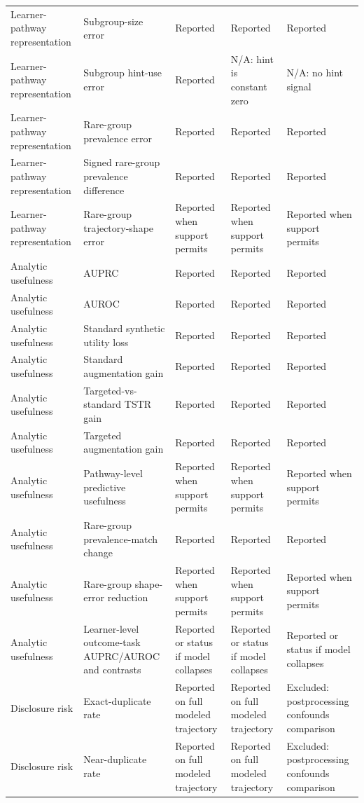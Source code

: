 \begin{longtable}{@{}p{2.8cm}p{5.2cm}p{4.65cm}p{4.65cm}p{4.65cm}@{}}
Learner-pathway representation & Subgroup-size error & Reported & Reported & Reported \\
Learner-pathway representation & Subgroup hint-use error & Reported & N/A: hint is constant zero & N/A: no hint signal \\
Learner-pathway representation & Rare-group prevalence error & Reported & Reported & Reported \\
Learner-pathway representation & Signed rare-group prevalence difference & Reported & Reported & Reported \\
Learner-pathway representation & Rare-group trajectory-shape error & Reported when support permits & Reported when support permits & Reported when support permits \\
Analytic usefulness & AUPRC & Reported & Reported & Reported \\
Analytic usefulness & AUROC & Reported & Reported & Reported \\
Analytic usefulness & Standard synthetic utility loss & Reported & Reported & Reported \\
Analytic usefulness & Standard augmentation gain & Reported & Reported & Reported \\
Analytic usefulness & Targeted-vs-standard TSTR gain & Reported & Reported & Reported \\
Analytic usefulness & Targeted augmentation gain & Reported & Reported & Reported \\
Analytic usefulness & Pathway-level predictive usefulness & Reported when support permits & Reported when support permits & Reported when support permits \\
Analytic usefulness & Rare-group prevalence-match change & Reported & Reported & Reported \\
Analytic usefulness & Rare-group shape-error reduction & Reported when support permits & Reported when support permits & Reported when support permits \\
Analytic usefulness & Learner-level outcome-task AUPRC/AUROC and contrasts & Reported or status if model collapses & Reported or status if model collapses & Reported or status if model collapses \\
Disclosure risk & Exact-duplicate rate & Reported on full modeled trajectory & Reported on full modeled trajectory & Excluded: postprocessing confounds comparison \\
Disclosure risk & Near-duplicate rate & Reported on full modeled trajectory & Reported on full modeled trajectory & Excluded: postprocessing confounds comparison \\

\end{longtable}
